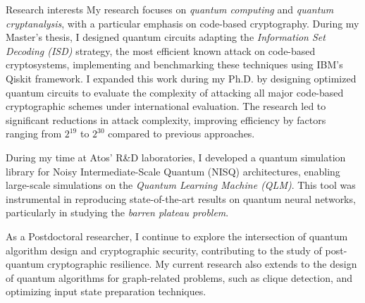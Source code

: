 \documentclass[
	a4paper, %
	10pt, %
]{tresume} %
\begin{document}
\begin{tSection}{Research interests}
    My research focuses on \emph{quantum computing} and \emph{quantum cryptanalysis}, with a particular emphasis on code-based cryptography. During my Master's thesis, I designed quantum circuits adapting the \emph{Information Set Decoding (ISD)} strategy, the most efficient known attack on code-based cryptosystems, implementing and benchmarking these techniques using IBM’s Qiskit framework. I expanded this work during my Ph.D. by designing optimized quantum circuits to evaluate the complexity of attacking all major code-based cryptographic schemes under international evaluation. The research led to significant reductions in attack complexity, improving efficiency by factors ranging from $2^{19}$ to $2^{30}$ compared to previous approaches.

During my time at Atos' R\&D laboratories, I developed a quantum simulation library for Noisy Intermediate-Scale Quantum (NISQ) architectures, enabling large-scale simulations on the \emph{Quantum Learning Machine (QLM)}. This tool was instrumental in reproducing state-of-the-art results on quantum neural networks, particularly in studying the \emph{barren plateau problem}.

As a Postdoctoral researcher, I continue to explore the intersection of quantum algorithm design and cryptographic security, contributing to the study of post-quantum cryptographic resilience. My current research also extends to the design of quantum algorithms for graph-related problems, such as clique detection, and optimizing input state preparation techniques.

\end{tSection}
\end{document}
